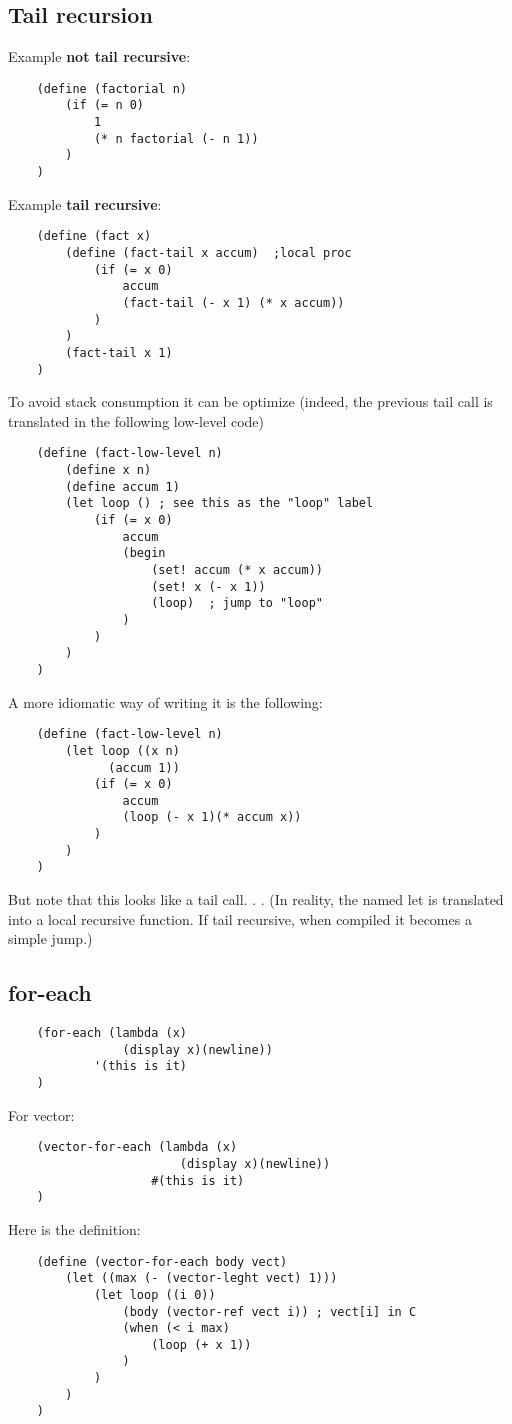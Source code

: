 \subsection{Tail recursion}
Example \textbf{not tail recursive}:
\begin{lstlisting}
    (define (factorial n)
        (if (= n 0)
            1
            (* n factorial (- n 1))
        )
    )
\end{lstlisting}
Example \textbf{tail recursive}:
\begin{lstlisting}
    (define (fact x)
        (define (fact-tail x accum)  ;local proc
            (if (= x 0)
                accum
                (fact-tail (- x 1) (* x accum))
            )
        )
        (fact-tail x 1)
    )
\end{lstlisting}
To avoid stack consumption it can be optimize (indeed, the previous tail call is translated in the following low-level code)
\begin{lstlisting}
    (define (fact-low-level n)
        (define x n)
        (define accum 1)
        (let loop () ; see this as the "loop" label
            (if (= x 0)
                accum
                (begin
                    (set! accum (* x accum))
                    (set! x (- x 1))
                    (loop)  ; jump to "loop"
                )
            )
        )  
    )
\end{lstlisting}
A more idiomatic way of writing it is the following:
\begin{lstlisting}
    (define (fact-low-level n)
        (let loop ((x n)
              (accum 1))
            (if (= x 0)
                accum
                (loop (- x 1)(* accum x))
            )
        )  
    )
\end{lstlisting}
But note that this looks like a tail call. . .
(In reality, the named let is translated into a local recursive function. If tail
recursive, when compiled it becomes a simple jump.)

\subsection{for-each}
\begin{lstlisting}
    (for-each (lambda (x)
                (display x)(newline))
            '(this is it)
    )
\end{lstlisting}
For vector:
\begin{lstlisting}
    (vector-for-each (lambda (x)
                        (display x)(newline))
                    #(this is it)
    )
\end{lstlisting}
Here is the definition:
\begin{lstlisting}
    (define (vector-for-each body vect)
        (let ((max (- (vector-leght vect) 1)))
            (let loop ((i 0))
                (body (vector-ref vect i)) ; vect[i] in C
                (when (< i max)
                    (loop (+ x 1))
                )
            )
        )
    )
\end{lstlisting}

